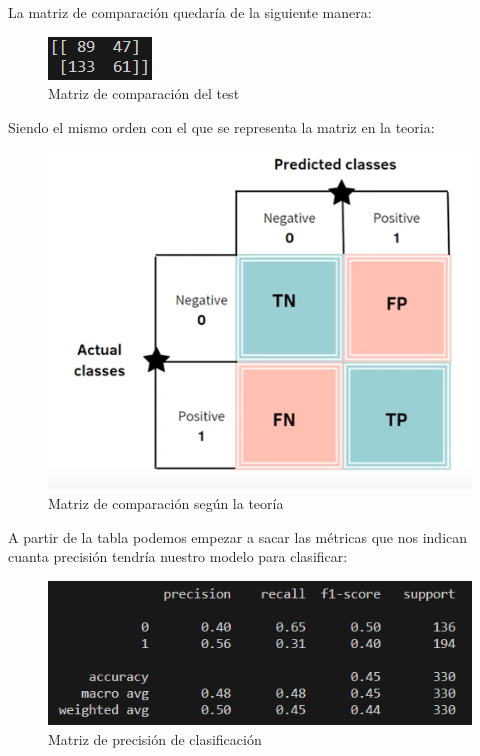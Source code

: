 \documentclass[12pt]{article} %
\begin{document}
La matriz de comparación quedaría de la siguiente manera:

\begin{figure}[H]
\centering
\includegraphics[width=\textwidth]{data3}
\caption{Matriz de comparación del test}
\end{figure}

Siendo el mismo orden con el que se representa la matriz en la teoria:

\begin{figure}[H]
\centering
\includegraphics[width=\textwidth]{MatrizComparacion}
\caption{Matriz de comparación según la teoría}
\end{figure}

A partir de la tabla podemos empezar a sacar las métricas que nos indican cuanta precisión tendría nuestro modelo para clasificar:

\begin{figure}[H]
\centering
\includegraphics[width=\textwidth]{metricas}
\caption{Matriz de precisión de clasificación}
\end{figure}
\end{document}
